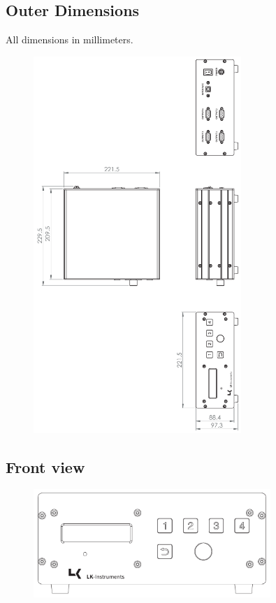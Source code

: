 \documentclass[a4paper, final, 12pt, oneside]{scrartcl}
\numberwithin{equation}{section}
\numberwithin{table}{section}
\numberwithin{figure}{section}
\begin{document}
\FloatBarrier
\newpage

\subsection*{Outer Dimensions}
All dimensions in millimeters.
\begin{figure}[!htp]
  \centering
  \includegraphics[angle=0,origin=c,width=0.7\textwidth]{./drawings/MG22131_outline2_text.pdf}
\end{figure}
\FloatBarrier

\subsection*{Front view}
\begin{figure}[!htp]
  \centering
  \includegraphics[angle=0,origin=c,width=0.8\textwidth]{./drawings/MG22131_front_text.pdf}
\end{figure}
\end{document}
